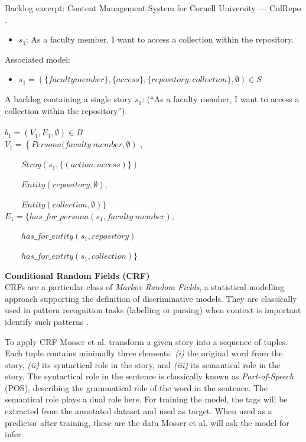 \begin{example}\label{ex_2}
Backlog excerpt: Content Management System for Cornell University — CulRepo \emph{\cite{Dalpiaz2018}}.
\begin{itemize}
\item $s_1$: As a faculty member, I want to access a collection within the repository.
\end{itemize}
Associated model:
\begin{itemize}
\item $s_1 = (\{ faculty member \} ,\{ access\} ,\{ repository, collection\} ,\emptyset)\in S$
\end{itemize}
A backlog containing a single story $s_1$: (\enquote{As a faculty member, I want to access a collection within the repository}). \\ \\ 
$b_1=\left(V_1 , E_1,\emptyset \right ) \in B$ \\ 
$V_1=\left \{ Persona(faculty \ member, \emptyset \right )$ ,

\ \ \ \ $Stroy \left (s_1, \{ \left (action, access \right ) \} \right )$

\ \ \ \ $Entity \left (repository, \emptyset \right ) $,

\ \ \ \ $Entity(collection, \emptyset ) \} $ \\ 
$E_1 = \{ has\_for\_persona(s_1,faculty \ member)$,

\ \ \ \ $has\_for\_entity \left (s_1,repository \right )$

\ \ \ \ $has\_for\_entity(s_1, collection)\}$
\end{example}
\textbf{Conditional Random Fields (CRF)} \\ 
CRFs \cite{Lafferty2001} are a particular class of \emph{Markov Random Fields}, a statistical modelling approach supporting the definition of discriminative models. They are classically used in pattern recognition tasks (labelling or parsing) when context is important identify such patterns \cite{arulmohan2023extracting}.

To apply CRF Mosser et al. transform a given story into a sequence of tuples. Each tuple contains minimally three elements: \emph{(i)} the original word from the story, \emph{(ii)} its syntactical role in the story, and \emph{(iii)} its semantical role in the story. The syntactical role in the sentence is classically known as \emph{Part-of-Speech} (POS), describing the grammatical role of the word in the sentence. The semantical role plays a dual role here. For training the model, the tags will be extracted from the annotated dataset and used as target. When used as a predictor after training, these are the data Mosser et al. will ask the model for infer.

